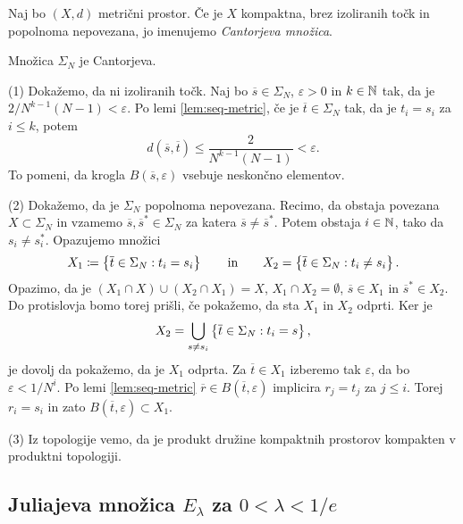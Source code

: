\begin{definicija}
    Naj bo \((X, d)\) metrični prostor. Če je \(X\) kompaktna, brez izoliranih točk in popolnoma nepovezana, jo imenujemo \emph{Cantorjeva množica}.
\end{definicija}

\begin{trditev}
    Množica \(\Sigma_N\) je Cantorjeva.
\end{trditev}

\begin{dokaz}
    (1) Dokažemo, da ni izoliranih točk. Naj bo \(\overline{s} \in \Sigma_N\), \(\varepsilon > 0\) in \(k \in \mathbb N\) tak, da je \(2/N^{k - 1} (N -1) < \varepsilon\). Po lemi \ref{lem:seq-metric}, če je \(\overline{t} \in \Sigma_N\) tak, da je \(t_i = s_i\) za \(i \leq k\), potem
    \[d (\overline{s}, \overline{t}) \leq \frac{2}{N^{k - 1} (N - 1)} < \varepsilon.\]
    To pomeni, da krogla \(B (\overline{s}, \varepsilon)\) vsebuje neskončno elementov.

    (2) Dokažemo, da je \(\Sigma_N\) popolnoma nepovezana. Recimo, da obstaja povezana \(X \subset \Sigma_N\) in vzamemo \(\overline{s}, \overline{s}^* \in \Sigma_N\) za katera \(\overline{s} \neq \overline{s}^*\). Potem obstaja \(i \in \mathbb N\), tako da \(s_i \neq s_i^*\). Opazujemo množici
    \[X_1 \coloneq \left\{ \overline{t} \in \Sigma_N : t_i = s_i \right\} \qquad \text{in} \qquad X_2 = \left\{ \overline{t} \in \Sigma_N : t_i \neq s_i \right\}.\]
    Opazimo, da je \((X_1 \cap X) \cup (X_2 \cap X_1) = X\), \(X_1 \cap X_2 = \emptyset\), \(\overline{s} \in X_1\) in \(\overline{s}^* \in X_2\). Do protislovja bomo torej prišli, če pokažemo, da sta \(X_1\) in \(X_2\) odprti. Ker je
    \[X_2 = \bigcup_{s \neq s_i} \left\{ \overline{t} \in \Sigma_N : t_i = s \right\},\]
    je dovolj da pokažemo, da je \(X_1\) odprta. Za \(\overline{t} \in X_1\) izberemo tak \(\varepsilon\), da bo \(\varepsilon < 1 / N^i\). Po lemi \ref{lem:seq-metric} \(\overline{r} \in B (\overline{t}, \varepsilon)\) implicira \(r_j = t_j\) za \(j \leq i\). Torej \(r_i = s_i\) in zato \(B (\overline{t}, \varepsilon) \subset X_1\).

    (3) Iz topologije vemo, da je produkt družine kompaktnih prostorov kompakten v produktni topologiji.
\end{dokaz}

\subsection{Juliajeva množica \texorpdfstring{\(E_\lambda\)}{E\_\lambda} za \texorpdfstring{\(0 < \lambda < 1/e\)}{0 < \lambda < 1/e}}

